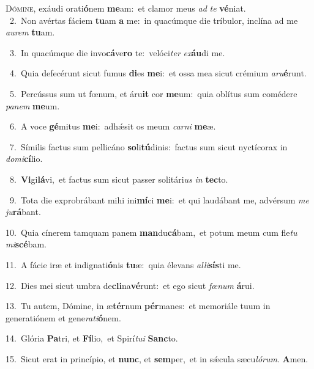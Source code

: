 \lettrine{\initial\textcolor{\initialcolor}{D}}{ómine,} exáudi orati\-\textbf{ó}\-nem \textbf{me}\-am:~\star et clamor meus \textit{ad} \textit{te} \textbf{vé}\-niat.\\
{\numbfont\textcolor{\numbcolor}{~2.}}~Non avértas fáciem \textbf{tu}\-am \textbf{a} me:~\star in quacúmque die tríbulor, inclína ad me \textit{au}\-\textit{rem} \textbf{tu}\-am.\par
{\numbfont\textcolor{\numbcolor}{~3.}}~In quacúmque die invo\-\textbf{cá}\-ve\textbf{ro} te:~\star velóci\textit{ter} \textit{ex}\-\textbf{áu}di me.\par
{\numbfont\textcolor{\numbcolor}{~4.}}~Quia defecérunt sicut fumus \textbf{di}\-es \textbf{me}\-i:~\star et ossa mea sicut crémium \textit{a}\-\textit{ru}\textbf{é}runt.\par
{\numbfont\textcolor{\numbcolor}{~5.}}~Percússus sum ut fœnum, et áru\textbf{it} cor \textbf{me}\-um:~\star quia oblítus sum comédere \textit{pa}\-\textit{nem} \textbf{me}\-um.\par
{\numbfont\textcolor{\numbcolor}{~6.}}~A voce \textbf{gé}\-mitus \textbf{me}\-i:~\star adhǽsit os meum \textit{car}\-\textit{ni} \textbf{me}\-æ.\par
{\numbfont\textcolor{\numbcolor}{~7.}}~Símilis factus sum pellicáno \textbf{so}\-li\-\textbf{tú}\-dinis:~\star factus sum sicut nyctícorax in \textit{do}\-\textit{mi}\textbf{cí}lio.\par
{\numbfont\textcolor{\numbcolor}{~8.}}~\-\textbf{Vi}\-gi\-\textbf{lá}\-vi,~\star et factus sum sicut passer solitári\textit{us} \textit{in} \textbf{tec}\-to.\par
{\numbfont\textcolor{\numbcolor}{~9.}}~Tota die exprobrábant mihi ini\-\textbf{mí}\-ci \textbf{me}\-i:~\star et qui laudábant me, advérsum \textit{me} \textit{ju}\-\textbf{rá}bant.\par
{\numbfont\textcolor{\numbcolor}{10.}}~Quia cínerem tamquam panem \textbf{man}\-du\-\textbf{cá}\-bam,~\star et potum meum cum fle\textit{tu} \textit{mi}\-\textbf{scé}bam.\par
{\numbfont\textcolor{\numbcolor}{11.}}~A fácie iræ et indignati\-\textbf{ó}\-nis \textbf{tu}\-æ:~\star quia élevans \textit{al}\-\textit{li}\textbf{sís}ti me.\par
{\numbfont\textcolor{\numbcolor}{12.}}~Dies mei sicut umbra de\-\textbf{cli}\-na\-\textbf{vé}\-runt:~\star et ego sicut \textit{fœ}\-\textit{num} \textbf{á}\-rui.\par
{\numbfont\textcolor{\numbcolor}{13.}}~Tu autem, Dómine, in æ\-\textbf{tér}\-num \textbf{pér}\-manes:~\star et memoriále tuum in generatiónem et gene\-\textit{ra}\-\textit{ti}\textbf{ó}nem.\par
{\numbfont\textcolor{\numbcolor}{14.}}~Glória \textbf{Pa}\-tri, et \textbf{Fí}\-lio,~\star et Spirí\-\textit{tu}\-\textit{i} \textbf{Sanc}\-to.\par
{\numbfont\textcolor{\numbcolor}{15.}}~Sicut erat in princípio, et \textbf{nunc}\-, et \textbf{sem}\-per,~\star et in sǽcula sæcu\-\textit{ló}\-\textit{rum}. \textbf{A}\-men.\par
